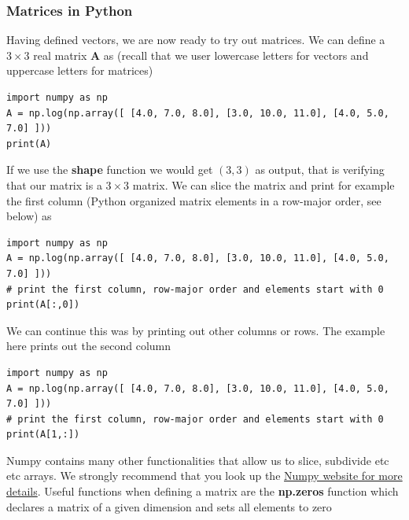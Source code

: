\documentclass{beamer}
\begin{document}
\begin{frame}
\frametitle{Matrices in Python}

Having defined vectors, we are now ready to try out matrices. We can
define a $3 \times 3 $ real matrix $\bm{A}$ as (recall that we user
lowercase letters for vectors and uppercase letters for matrices)





\begin{verbatim}
import numpy as np
A = np.log(np.array([ [4.0, 7.0, 8.0], [3.0, 10.0, 11.0], [4.0, 5.0, 7.0] ]))
print(A)

\end{verbatim}

If we use the \textbf{shape} function we would get $(3, 3)$ as output, that is verifying that our matrix is a $3\times 3$ matrix. We can slice the matrix and print for example the first column (Python organized matrix elements in a row-major order, see below) as





\begin{verbatim}
import numpy as np
A = np.log(np.array([ [4.0, 7.0, 8.0], [3.0, 10.0, 11.0], [4.0, 5.0, 7.0] ]))
# print the first column, row-major order and elements start with 0
print(A[:,0]) 

\end{verbatim}

We can continue this was by printing out other columns or rows. The example here prints out the second column





\begin{verbatim}
import numpy as np
A = np.log(np.array([ [4.0, 7.0, 8.0], [3.0, 10.0, 11.0], [4.0, 5.0, 7.0] ]))
# print the first column, row-major order and elements start with 0
print(A[1,:]) 

\end{verbatim}

Numpy contains many other functionalities that allow us to slice, subdivide etc etc arrays. We strongly recommend that you look up the \href{{http://www.numpy.org/}}{Numpy website for more details}. Useful functions when defining a matrix are the \textbf{np.zeros} function which declares a matrix of a given dimension and sets all elements to zero







\end{frame}
\end{document}
